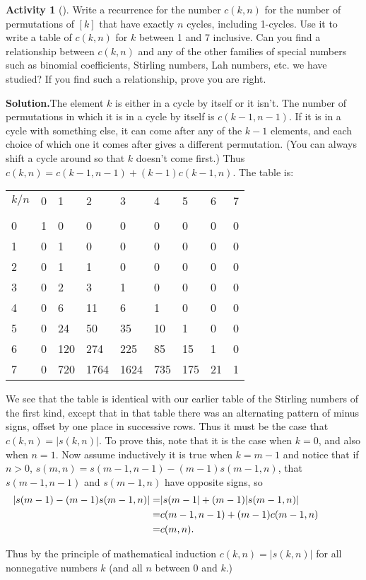 \documentclass[10pt,]{book}
\theoremstyle{plain}
\theoremstyle{definition}
\newtheorem{activity}[project]{Activity}
\numberwithin{equation}{chapter}
\newcommand{\hrulethin}  {\noalign{\hrule height 0.04em}}
\newcommand{\amp}{&}
\begin{document}
\begin{activity}[]\label{activity-257}
Write a recurrence for the number \(c(k,n)\) for the number of permutations of \([k]\) that have exactly \(n\) cycles, including 1-cycles. Use it to write a table of \(c(k,n)\) for \(k\) between 1 and 7 inclusive. Can you find a relationship between \(c(k,n)\) and any of the other families of special numbers such as binomial coefficients, Stirling numbers, Lah numbers, etc. we have studied? If you find such a relationship, prove you are right.%
\par\medskip\noindent%
\textbf{Solution.}\quad The element \(k\) is either in a cycle by itself or it isn't. The number of permutations in which it is in a cycle by itself is \(c(k-1,n-1)\). If it is in a cycle with something else, it can come after any of the \(k-1\) elements, and each choice of which one it comes after gives a different permutation. (You can always shift a cycle around so that \(k\) doesn't come first.) Thus \(c(k,n) = c(k-1,n-1) + (k-1)c(k-1,n)\). The table is:%
\begin{tabular}{lllllllll}
\(k/n\)&0&1&2&3&4&5&6&7\tabularnewline[0pt]
&&&&&&&&\tabularnewline\hrulethin
0&1&0&0&0&0&0&0&0\tabularnewline[0pt]
1&0&1&0&0&0&0&0&0\tabularnewline[0pt]
2&0&1&1&0&0&0&0&0\tabularnewline[0pt]
3&0&2&3&1&0&0&0&0\tabularnewline[0pt]
4&0&6&11&6&1&0&0&0\tabularnewline[0pt]
5&0&24&50&35&10&1&0&0\tabularnewline[0pt]
6&0&120&274&225&85&15&1&0\tabularnewline[0pt]
7&0&720&1764&1624&735&175&21&1
\end{tabular}
We see that the table is identical with our earlier table of the Stirling numbers of the first kind, except that in that table there was an alternating pattern of minus signs, offset by one place in successive rows. Thus it must be the case that \(c(k,n)=
|s(k,n)|\). To prove this, note that it is the case when \(k=0\), and also when \(n=1\). Now assume inductively it is true when \(k= m-1\) and notice that if \(n>0\), \(s(m,n)=s(m-1,n-1)-(m-1)s(m-1,n)\), that \(s(m-1,n-1)\) and \(s(m-1,n)\) have opposite signs, so%
\begin{align*}
\hspace{-.5in}|s(m-1)-(m-1)s(m-1,n)| =\amp  |s(m-1| +
(m-1)|s(m-1,n)|\\
=\amp c(m-1,n-1)+(m-1)c(m-1,n)\\
=\amp  c(m,n).
\end{align*}
%
\par
Thus by the principle of mathematical induction \(c(k,n) = |s(k,n)|\) for all nonnegative numbers \(k\) (and all \(n\) between 0 and \(k\).)%
\end{activity}
\end{document}
